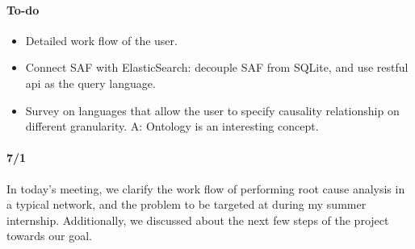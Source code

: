 \documentclass{article}
\begin{document}
\paragraph{To-do}

\begin{itemize}
\item Detailed work flow of the user.
\item Connect SAF with ElasticSearch: decouple SAF from SQLite, and use restful
  api as the query language.
\item Survey on languages that allow the user to specify causality relationship
  on different granularity.
A: Ontology is an interesting concept. 
\end{itemize}

\paragraph{7/1}

In today's meeting, we clarify the work flow of performing root cause analysis
in a typical network, and the problem to be targeted at during my summer
internship. Additionally, we discussed about the next few steps of the project
towards our goal.
\end{document}
